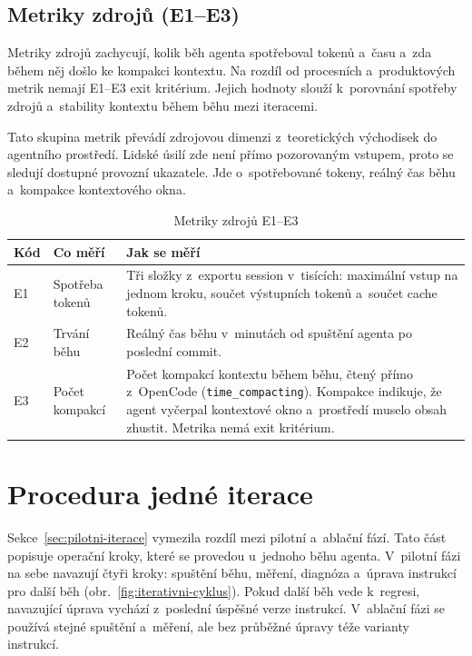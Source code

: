 \subsection{Metriky zdrojů (E1--E3)}
\label{sec:metriky-zdroju}

Metriky zdrojů zachycují, kolik běh agenta spotřeboval tokenů a~času
a~zda během něj došlo ke kompakci kontextu. Na rozdíl od procesních
a~produktových metrik nemají \acs{E1}--\acs{E3} exit kritérium. Jejich
hodnoty slouží k~porovnání spotřeby zdrojů a~stability kontextu během běhu
mezi iteracemi.

Tato skupina metrik převádí zdrojovou dimenzi z~teoretických
východisek do agentního prostředí. Lidské úsilí zde není přímo
pozorovaným vstupem, proto se sledují dostupné provozní ukazatele.
Jde o~spotřebované tokeny, reálný čas běhu a~kompakce kontextového
okna.

\begin{table}[htbp]
\centering
\caption{Metriky zdrojů E1--E3}
\label{tab:e1-e3}
\footnotesize
\setlength{\tabcolsep}{4pt}
\begin{tabularx}{\linewidth}{@{}lMX@{}}
\toprule
\textbf{Kód} & \textbf{Co měří} & \textbf{Jak se měří} \\
\midrule
\acs{E1} & Spotřeba tokenů &
Tři složky z~exportu session v~tisících: maximální vstup na jednom
kroku, součet výstupních tokenů a~součet cache tokenů. \\
\addlinespace
\acs{E2} & Trvání běhu &
Reálný čas běhu v~minutách od spuštění agenta po poslední commit. \\
\addlinespace
\acs{E3} & Počet kompakcí &
Počet kompakcí kontextu během běhu, čtený přímo z~OpenCode
(\texttt{time\_compacting}). Kompakce indikuje, že agent
vyčerpal kontextové okno a~prostředí muselo obsah zhustit.
Metrika nemá exit kritérium. \\
\bottomrule
\end{tabularx}
\end{table}
\FloatBarrier


\section{Procedura jedné iterace}
\label{sec:procedura-behu}

Sekce~\ref{sec:pilotni-iterace} vymezila rozdíl mezi pilotní
a~ablační fází. Tato část popisuje operační kroky, které se provedou
u~jednoho běhu agenta. V~pilotní fázi na sebe navazují čtyři kroky:
spuštění běhu, měření, diagnóza a~úprava instrukcí pro další běh
(obr.~\ref{fig:iterativni-cyklus}). Pokud další běh vede k~regresi,
navazující úprava vychází z~poslední úspěšné verze instrukcí.
V~ablační fázi se používá stejné spuštění a~měření, ale bez průběžné
úpravy téže varianty instrukcí.

